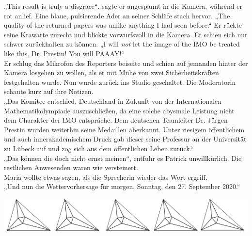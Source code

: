 \documentclass[oneside]{memoir}
\newcommand{\parasep}{
\bigskip
\bigskip
\begin{center} 
   \includegraphics[scale=.08]{parasep5.jpg} 
\end{center}
\bigskip
\bigskip
}
\begin{document}
„This result is truly a disgrace“, sagte er angespannt in die Kamera, während er rot anlief. Eine blaue, pulsierende Ader an seiner Schläfe stach hervor. „The quality of the returned papers was unlike anything I had seen before.“ Er rückte seine Krawatte zurecht und blickte vorwurfsvoll in die Kamera. Er schien sich nur schwer zurückhalten zu können. „I will \textit{not} let the image of the IMO be treated like this, Dr. Prestin! You will PAAAY!“ \\
Er schlug das Mikrofon des Reporters beiseite und schien auf jemanden hinter der Kamera losgehen zu wollen, als er mit Mühe von zwei Sicherheitskräften festgehalten wurde. Nun wurde zurück ins Studio geschaltet. Die Moderatorin schaute kurz auf ihre Notizen. \\
„Das Komitee entschied, Deutschland in Zukunft von der Internationalen Mathematikolympiade auszuschließen, da eine solche abysmale Leistung nicht dem Charakter der IMO entspräche. Dem deutschen Teamleiter Dr. Jürgen Prestin wurden weiterhin seine Medaillen aberkannt. Unter riesigem öffentlichem und auch innerakademischem Druck gab dieser seine Professur an der Universität zu Lübeck auf und zog sich aus dem öffentlichen Leben zurück.“ \\
„Das können die doch nicht ernst meinen“, entfuhr es Patrick unwillkürlich. Die restlichen Anwesenden waren wie versteinert. \\
Maria wollte etwas sagen, als die Sprecherin wieder das Wort ergriff. \\
„Und nun die Wettervorhersage für morgen, Sonntag, den 27. September 2020.“

     
     \parasep
     
\end{document}

